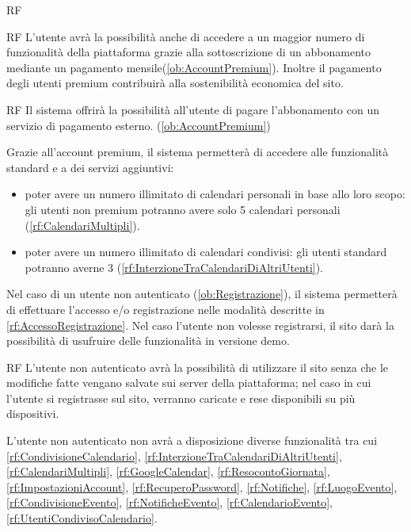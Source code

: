 \begin{listaPersonale}{RF}
\begin{listaPersonale2}{RF}
		 L'utente avrà la possibilità anche di accedere a un maggior numero di funzionalità della piattaforma grazie alla sottoscrizione di un abbonamento mediante un pagamento mensile(\ref{ob:AccountPremium}). Inoltre il pagamento degli utenti premium contribuirà alla sostenibilità economica del sito.

		\begin{listaPersonale3}{RF}
			 Il sistema offrirà la possibilità all'utente di pagare l'abbonamento con un servizio di pagamento esterno. (\ref{ob:AccountPremium})

			 Grazie all'account premium, il sistema permetterà di accedere alle funzionalità standard e a dei servizi aggiuntivi:
			\begin{itemize}
				\item poter avere un numero illimitato di calendari personali in base allo loro scopo: gli utenti non premium potranno avere solo 5 calendari personali (\ref{rf:CalendariMultipli}).
				\item poter avere un numero illimitato di calendari condivisi: gli utenti standard potranno averne 3 (\ref{rf:InterzioneTraCalendariDiAltriUtenti}).
			\end{itemize}

		\end{listaPersonale3}
	\end{listaPersonale2}

	 Nel caso di un utente non autenticato (\ref{ob:Registrazione}), il sistema permetterà di effettuare l'accesso e/o registrazione nelle modalità descritte in \ref{rf:AccessoRegistrazione}. Nel caso l'utente non volesse registrarsi, il sito darà la possibilità di usufruire delle funzionalità in versione demo.

	\begin{listaPersonale2}{RF}
			L'utente non autenticato avrà la possibilità di utilizzare il sito senza che le modifiche fatte vengano salvate sui server della piattaforma; nel caso in cui l'utente si registrasse sul sito, verranno caricate e rese disponibili su più dispositivi.

\begin{listaPersonale3}[RF]{}
 L'utente non autenticato non avrà a disposizione diverse funzionalità tra cui \ref{rf:CondivisioneCalendario}, \ref{rf:InterzioneTraCalendariDiAltriUtenti}, \ref{rf:CalendariMultipli}, \ref{rf:GoogleCalendar}, \ref{rf:ResocontoGiornata}, \ref{rf:ImpostazioniAccount}, \ref{rf:RecuperoPassword}, \ref{rf:Notifiche}, \ref{rf:LuogoEvento}, \ref{rf:CondivisioneEvento}, \ref{rf:NotificheEvento}, \ref{rf:CalendarioEvento}, \ref{rf:UtentiCondivisoCalendario}.
		\end{listaPersonale3}
	\end{listaPersonale2}


\end{listaPersonale}
